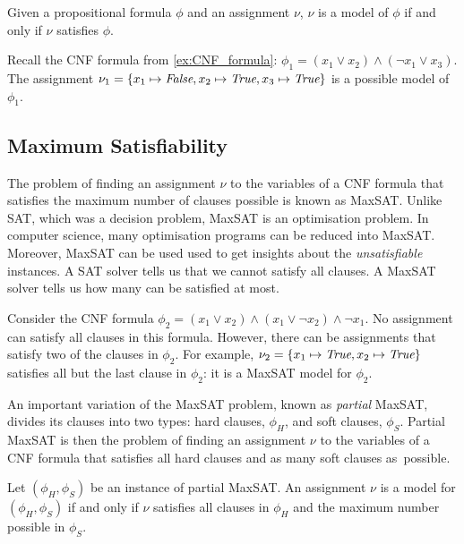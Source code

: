 \begin{definition}[Model]
Given a propositional formula  \(\phi\) and an assignment \(\nu\), \(\nu\) is a model of \(\phi\) if and only if \(\nu\) satisfies \(\phi\).
\end{definition}

\begin{example}
Recall the \ac{CNF} formula from \autoref{ex:CNF_formula}: \(\phi_1 = (x_1 \lor x_2) \land (\neg x_1 \lor x_3)\). The assignment \(\nu_1 = \{x_1 \mapsto \textit{False}, x_2 \mapsto \textit{True}, x_3 \mapsto \textit{True}\}\) is a possible model of \(\phi_1\).
\end{example}

\subsection{Maximum Satisfiability}
The problem of finding an assignment \(\nu\) to the variables of a CNF formula that satisfies the maximum number of clauses possible is known as \ac{MaxSAT}.
Unlike \ac{SAT}, which was a decision problem, \ac{MaxSAT} is an optimisation problem.
In computer science, many optimisation programs can be reduced into \ac{MaxSAT}. Moreover, \ac{MaxSAT} can be used used to get insights about the \textit{unsatisfiable} instances.
A \ac{SAT} solver tells us that we cannot satisfy all clauses. A \ac{MaxSAT} solver tells us how many can be satisfied at most.

\begin{example}\label{ex:MaxSAT}
Consider the \ac{CNF} formula \(\phi_2 = (x_1 \lor x_2) \land (x_1 \lor \neg x_2) \land \neg x_1\).
No assignment can satisfy all clauses in this formula. 
However, there can be assignments that satisfy two of the clauses in \(\phi_2\).
For example, \(\nu_2 = \{x_1 \mapsto \textit{True}, x_2 \mapsto \textit{True}\}\) satisfies all but the last clause in \(\phi_2\): it is a \ac{MaxSAT} model for \(\phi_2\).
\end{example}

\noindent
An important variation of the \ac{MaxSAT} problem, known as \textit{partial} \ac{MaxSAT}, divides its clauses into two types: hard clauses, \(\phi_H\), and soft clauses, \(\phi_S\).
Partial \ac{MaxSAT} is then the problem of finding an assignment \(\nu\) to the variables of a \ac{CNF} formula that satisfies all hard clauses and as many soft clauses as~possible.

\begin{definition}[Model]
Let \((\phi_H, \phi_S)\) be an instance of partial \ac{MaxSAT}. An assignment \(\nu\) is a model for \((\phi_H, \phi_S)\) if and only if \(\nu\) satisfies all clauses in \(\phi_H\) and the maximum number possible in \(\phi_S\).
\end{definition}

